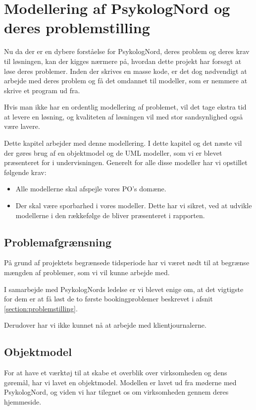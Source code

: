\section{Modellering af PsykologNord og deres problemstilling}
\label{kabitel:ModelleringPN}

Nu da der er en dybere forståelse for PsykologNord, deres problem og deres krav til løsningen, kan der kigges nærmere på, hvordan dette projekt har forsøgt at løse deres problemer.
Inden der skrives en masse kode, er det dog nødvendigt at arbejde med deres problem og få det omdannet til modeller, som er nemmere at skrive et program ud fra.

Hvis man ikke har en ordentlig modellering af problemet, vil det tage ekstra tid at levere en løsning, og kvaliteten af løsningen vil med stor sandsynlighed også være lavere.

Dette kapitel arbejder med denne modellering.
I dette kapitel og det næste vil der gøres brug af en objektmodel og de UML modeller, som vi er blevet præsenteret for i undervisningen.
Generelt for alle disse modeller har vi opstillet følgende krav:

\begin{itemize}
    \item Alle modellerne skal afspejle vores PO's domæne.
    \item Der skal være sporbarhed i vores modeller. Dette har vi sikret, ved at udvikle modellerne i den rækkefølge de bliver præsenteret i rapporten.
\end{itemize}


\subsection{Problemafgrænsning}
\label{problemafgraensning}
På grund af projektets begrænsede tidsperiode har vi været nødt til at begrænse mængden af problemer, som vi vil kunne arbejde med.

I samarbejde med PsykologNords ledelse er vi blevet enige om, at det vigtigste for dem er at få løst de to første bookingproblemer beskrevet i afsnit \ref{section:problemstilling}.

Derudover har vi ikke kunnet nå at arbejde med klientjournalerne.

\subsection{Objektmodel}
\label{objektmodel}

For at have et værktøj til at skabe et overblik over virksomheden og dens gøremål, har vi lavet en objektmodel.
Modellen er lavet ud fra møderne med PsykologNord, og viden vi har tilegnet os om virksomheden gennem deres hjemmeside.\cite{psykolognord}

